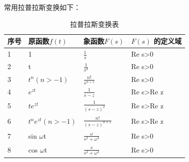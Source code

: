 \documentclass{ctexart}
\numberwithin{equation}{subsection}
\begin{document}
常用拉普拉斯变换如下：
\begin{table}[H] 
        \begin{center}
            \caption{拉普拉斯变换表}
        \begin{tabular}{|l|l|l|l|}
        \hline
        序号    & 原函数$f(t)$   & 象函数$F(s)$   & $F(s)$ 的定义域   \\ \hline
        1  & 1    & $\frac{1}{s}$ &  Re s>0  \\  \hline
        2    & t & $\frac{1}{s^2}$    & Re s>0 \\ \hline
        3  & $t^{n}(n>-1)$ & $\frac{n!}{s^{n+1}}$     &  Re s>0 \\ \hline
        4   & $e^{zt} $&$\frac{1}{s-z}$        &  Re s>Re z \\ \hline
        5 & $te^{zt}$ & $\frac{1}{(s-z)^2}$     &  Re s>Re z\\ \hline
        6 & $t^ne^{zt}(n>-1)$ & $\frac{n!}{(s-z)^{n+1}}$ & Re s>Re z\\ \hline
        7 & sin $\omega$t &  $\frac{\omega}{s^2+\omega^2}$& Re s>0 \\ \hline
        8 & cos $\omega$t & $\frac{s}{s^2+\omega^2}$& Re s>0\\ \hline
        \end{tabular}
        \end{center}
        \end{table}
\end{document}
